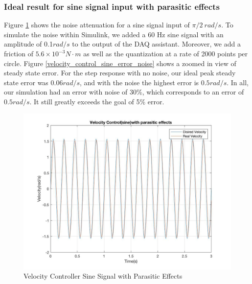 \documentclass[letterpaper]{article}
\begin{document}
\subsubsection*{Ideal result for sine signal input with parasitic effects}
Figure \ref{velocity_control_sine_noise} shows the noise attenuation for a sine signal input of $\pi /2 \ rad/s$. To simulate the noise within Simulink, we added a 60 Hz sine signal with an amplitude of 0.1$rad/s$ to the output of the DAQ assistant. Moreover, we add a friction of $5.6\times 10^{-3} N\cdot m$ as well as the quantization at a rate of 2000 points per circle. Figure \ref{velocity_control_sine_error_noise} shows a zoomed in view of steady state error. For the step response with no noise, our ideal peak steady state error was $0.06 rad/s$, and with the noise the highest error is $0.5 rad/s$.  In all, our simulation had an error with noise of 30\%, which corresponds to an error of $0.5 rad/s$. It still greatly exceeds the goal of 5\% error.\\
\begin{figure}[H]
\begin{center}
\includegraphics[width = 12cm]{Velocity_control(sine)with_parasitic_effects.jpg}
\caption{Velocity Controller Sine Signal with Parasitic Effects}
\label{velocity_control_sine_noise}
\end{center}
\end{figure}
\end{document}
